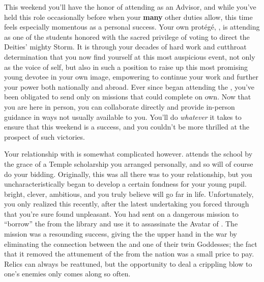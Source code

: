 \documentclass[char]{GL2020}
\begin{document}
This weekend you'll have the honor of attending \pSchool{} as an Advisor, and while you've held this role occasionally before when your \textbf{many} other duties allow, this time feels especially momentous as a personal success. Your own protégé, \cScholarship{\full}, is attending as one of the students honored with the sacred privilege of voting to direct the Deities' mighty Storm. It is through your decades of hard work and cutthroat determination that you now find yourself at this most auspicious event, not only as the voice of \cTechGod{} \cTechGod{\them}self, but also in such a position to raise up this most promising young devotee in your own image, empowering \cScholarship{\them} to continue your work and further your power both nationally and abroad. Ever since \cScholarship{} began attending the \pSchool{}, you've been obligated to send \cScholarship{\them} only on missions that \cScholarship{\they} could complete on  \cScholarship{\their} own. Now that you are here in person, you can collaborate directly and provide in-person guidance in ways not usually available to you. You'll do \emph{whatever} it takes to ensure that this weekend is a success, and you couldn't be more thrilled at the prospect of such victories. 

Your relationship with \cScholarship{} is somewhat complicated however. \cScholarship{} attends the school by the grace of a Temple scholarship you arranged personally, and so will of course do your bidding. Originally, this was all there was to your relationship, but you uncharacteristically began to develop a certain fondness for your young pupil. \cScholarship{\theyare} bright, clever, ambitious, and you truly believe \cScholarship{\they} will go far in life. Unfortunately, you only realized this recently, after the latest undertaking you forced \cScholarship{\them} through that you're sure \cScholarship{\they} found unpleasant. You had sent \cScholarship{} on a dangerous mission to ``borrow'' the \iScythe{} from the \pSc{} library and use it to assassinate the Avatar of \cEbbFull{\full}. The mission was a resounding success, giving the \pTech{} the upper hand in the war by eliminating the connection between the \pShip{} and one of their twin Goddesses; the fact that it removed the attunement of the \iScythe{} from the \pFarm{} nation was a small price to pay. Relics can always be reattuned, but the opportunity to deal a crippling blow to one's enemies only comes along so often. 
\end{document}

